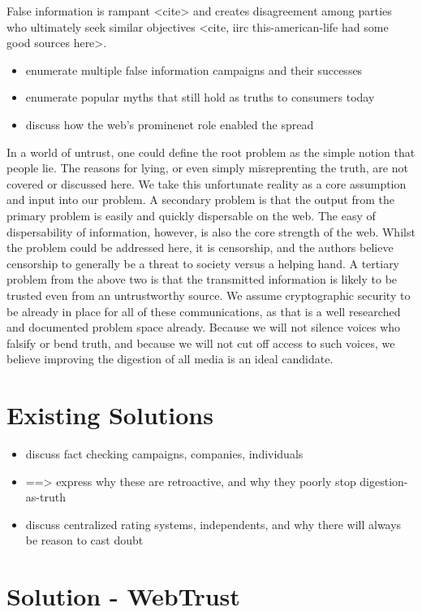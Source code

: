 \documentclass{paper}
\begin{document}
False information is rampant <cite> and creates disagreement among parties who
ultimately seek similar objectives <cite, iirc this-american-life had some good sources here>.
\begin{itemize}
  \item enumerate multiple false information campaigns and their successes
  \item enumerate popular myths that still hold as truths to consumers today
  \item discuss how the web's prominenet role enabled the spread
\end{itemize}

In a world of untrust, one could define the root problem as the simple notion
that people lie.  The reasons for lying, or even simply misreprenting the
truth, are not covered or discussed here.  We take this unfortunate reality as
a core assumption and input into our problem.  A secondary problem is that the
output from the primary problem is easily and quickly dispersable on the web.
The easy of dispersability of information, however, is also the core strength of
the web.  Whilst the problem could be addressed here, it is censorship, and the
authors believe censorship to generally be a threat to society versus a helping
hand.  A tertiary problem from the above two is that the transmitted information
is likely to be trusted even from an untrustworthy source.  We assume
cryptographic security to be already in place for all of these communications,
as that is a well researched and documented problem space already.  Because we
will not silence voices who falsify or bend truth, and because we will not
cut off access to such voices, we believe improving the digestion of all
media is an ideal candidate.

\section{Existing Solutions}

\begin{itemize}
  \item discuss fact checking campaigns, companies, individuals
  \item ==> express why these are retroactive, and why they poorly stop digestion-as-truth
  \item discuss centralized rating systems, independents, and why there will always be reason to cast doubt
\end{itemize}

\section{Solution - WebTrust}
\end{document}
